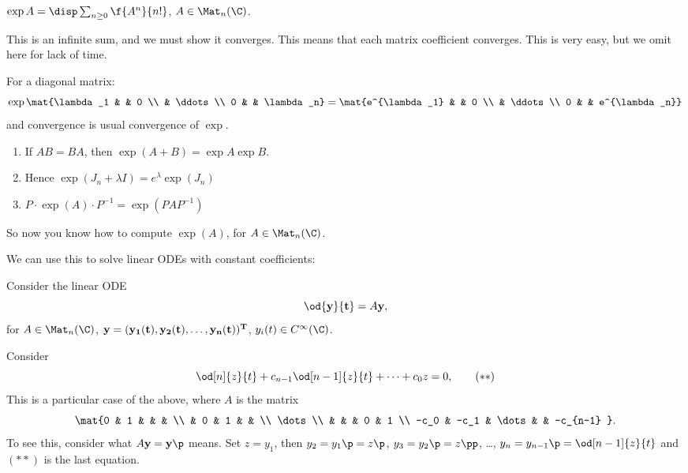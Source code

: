 \begin{definition}
	$\exp A=\disp\sum_{n\geq 0} \f{A^n}{n!}$, $A\in\Mat_n(\C)$. 
\end{definition}

This is an infinite sum, and we must show it converges. This means that each matrix coefficient converges. This is very easy, but we omit here for lack of time.

\begin{example}
	For a diagonal matrix:
	\begin{equation*}
		\exp\mat{\lambda_1 & & 0 \\ & \ddots \\ 0 & & \lambda_n} = \mat{e^{\lambda_1} & & 0 \\ & \ddots \\ 0 & & e^{\lambda_n}}
	\end{equation*}
	and convergence is usual convergence of $\exp$.
\end{example}

\begin{exercises}
\mbox{}
\begin{enumerate}
	\shortskip
	\item If $AB=BA$, then $\exp(A+B) = \exp A \exp B$.
	\item Hence $\exp(J_n+\lambda I) = e^\lambda \exp(J_n)$
	\item $P\cdot \exp(A) \cdot P^{-1} = \exp(PAP^{-1})$
\end{enumerate}
\end{exercises}

So now you know how to compute $\exp(A)$, for $A\in\Mat_n(\C)$.

We can use this to solve linear ODEs with constant coefficients:

Consider the linear ODE
\begin{equation*}
	\od{\bf{y}}{t} = A\bf{y},
\end{equation*}
for $A\in\Mat_n(\C)$, $\bf{y}=(y_1(t), y_2(t), \dots, y_n(t))^T$, $y_i(t)\in C^\infty(\C)$.

\begin{example}
	Consider
	\begin{equation*}
		\od[n]{z}{t} + c_{n-1} \od[n-1]{z}{t} + \cdots + c_0 z = 0,  \tag{$**$}
	\end{equation*}
This is a particular case of the above, where $A$ is the matrix 
$$\mat{0 & 1 &    &   &   \\
        & 0 & 1  &   &    \\
        \dots             \\
        &   &    & 0 & 1  \\
      -c_0 & -c_1 & \dots & & -c_{n-1}
}.$$
To see this, consider what 
	$A\bf{y} = \bf{y}\p$ means.  Set $z=y_1$, then $y_2=y_1\p=z\p$, $y_3=y_2\p=z\pp$, \ldots, $y_n=y_{n-1}\p = \od[n-1]{z}{t}$ and $(**)$ is the last equation.
\end{example}
	
